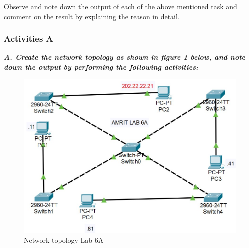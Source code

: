 \documentclass[a4paper,11pt]{article}
\begin{document}
\begin{Q}
    {
        Observe and note down the output of each of the above mentioned task and comment on
        the result by explaining the reason in detail.
    }
\end{Q}

%
%
%
%


%
%
%



\subsubsection{Activities A}

{\bfseries \textit{A. Create the network topology as shown in figure 1 below, and note down the output by performing the following activities:}}

\begin{figure}[H]
    \centering
    \includegraphics[scale=0.9,cframe=blue 0.5pt 3pt]{./FIG/Lab6A.jpg}
    \caption{Network topology Lab 6A}
\end{figure}
\end{document}
